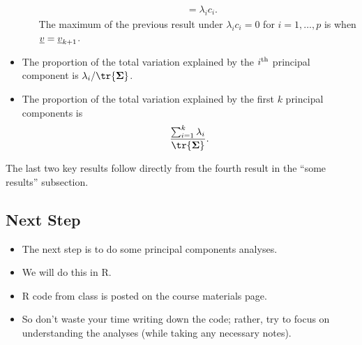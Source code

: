 \begin{itemize}
\begin{enumerate}[i.]
\begin{framed}
\begin{align*}
                                     & =\lambda_i c_i.
                              \end{align*}
                              The maximum of the previous result under $ \lambda_i c_i=0 $ for $ i=1,\ldots,p $ is when
                              $ \underline{v}=\underline{v}_{k+1} $.
                        \end{framed}
            \end{enumerate}
      \item The proportion of the total variation explained by the $ i\textsuperscript{th} $ principal component is
            $ \lambda_i/\tr{\Matrix{\Sigma}} $.
      \item The proportion of the total variation explained by the first $ k $ principal components is
            \[ \frac{\sum_{i=1}^{k}\lambda_i}{\tr{\Matrix{\Sigma}}}. \]
\end{itemize}
The last two key results follow directly from the fourth result in the ``some results'' subsection.
\subsection*{Next Step}
\begin{itemize}
      \item The next step is to do some principal components analyses.
      \item We will do this in R.
      \item R code from class is posted on the course materials page.
      \item So don't waste your time writing down the code; rather, try to focus on
            understanding the analyses (while taking any necessary notes).
\end{itemize}